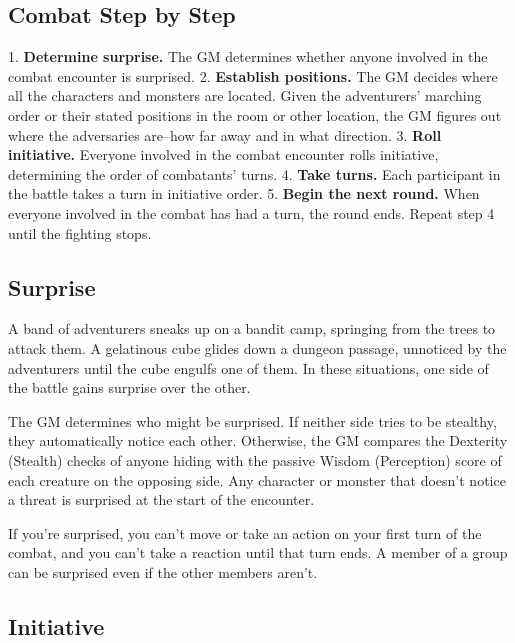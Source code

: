 \begin{aside}
    \subsection{Combat Step by Step}
    
    1.  \textbf{Determine surprise.} The GM determines whether anyone involved in the combat encounter is surprised.
    2.  \textbf{Establish positions.} The GM decides where all the characters and monsters are located. Given the adventurers' marching order or their stated positions in the room or other location, the GM figures out where the adversaries are--how far away and in what direction.
    3.  \textbf{Roll initiative.} Everyone involved in the combat encounter rolls initiative, determining the order of combatants' turns.
    4.  \textbf{Take turns.} Each participant in the battle takes a turn in initiative order.
    5.  \textbf{Begin the next round.} When everyone involved in the combat has had a turn, the round ends. Repeat step 4 until the fighting stops.
\end{aside}


\subsection{Surprise}

A band of adventurers sneaks up on a bandit camp, springing from the trees to attack them. A gelatinous cube glides down a dungeon passage, unnoticed by the adventurers until the cube engulfs one of them. In these situations, one side of the battle gains surprise over the other.

The GM determines who might be surprised. If neither side tries to be stealthy, they automatically notice each other. Otherwise, the GM compares the Dexterity (Stealth) checks of anyone hiding with the passive Wisdom (Perception) score of each creature on the opposing side. Any character or monster that doesn't notice a threat is surprised at the start of the encounter.

If you're surprised, you can't move or take an action on your first turn of the combat, and you can't take a reaction until that turn ends. A member of a group can be surprised even if the other members aren't.

\subsection{Initiative}

